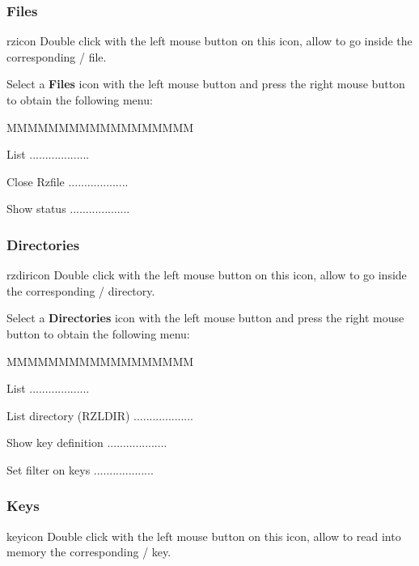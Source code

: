 \subsubsection{\RZ{} Files}
\begin{ICON}{rzicon}
Double click with the left mouse button on this icon, allow to go inside the
corresponding \ZEBRA/\RZ{} file.
\end{ICON}

Select a {\bf \RZ{} Files} icon with the left mouse button and press
the right mouse button to obtain the following menu:


\begin{DLsf}{MMMMMMMMMMMMMMMMMM}
\item[List]                      ...................
\item[Close Rzfile]              ...................
\item[Show status]               ...................
\end{DLsf}


\subsubsection{\RZ{} Directories}
\begin{ICON}{rzdiricon}
Double click with the left mouse button on this icon, allow to go inside the
corresponding \ZEBRA/\RZ{} directory.
\end{ICON}

Select a {\bf \RZ{} Directories} icon with the left mouse button and press
the right mouse button to obtain the following menu:


\begin{DLsf}{MMMMMMMMMMMMMMMMMM}
\item[List]                      ...................
\item[List directory (RZLDIR)]   ...................
\item[Show key definition]       ...................
\item[Set filter on keys]        ...................
\end{DLsf}


\subsubsection{\RZ{} Keys}
\begin{ICON}{keyicon}
Double click with the left mouse button on this icon, allow to read into memory
the corresponding \ZEBRA/\RZ{} key.
\end{ICON}

